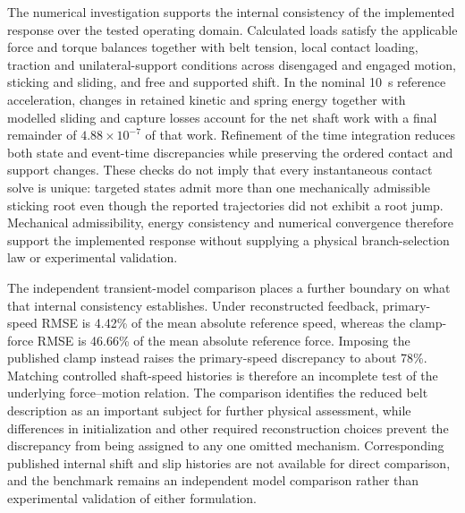 \documentclass[11pt]{report}
\numberwithin{equation}{section}
\begin{document}
The numerical investigation supports the internal consistency of the implemented response over
the tested operating domain. Calculated loads satisfy the applicable force and torque balances
together with belt tension, local contact loading, traction and unilateral-support conditions
across disengaged and engaged motion, sticking and sliding, and free and supported shift. In
the nominal \SI{10}{\second} reference acceleration, changes in retained kinetic and spring
energy together with modelled sliding and capture losses account for the net shaft work with a
final remainder of \(4.88\times10^{-7}\) of that work. Refinement of the time integration
reduces both state and event-time discrepancies while preserving the ordered contact and support
changes. These checks do not imply that every instantaneous contact solve is unique: targeted
states admit more than one mechanically admissible sticking root even though the reported
trajectories did not exhibit a root jump. Mechanical admissibility, energy consistency and
numerical convergence therefore support the implemented response without supplying a physical
branch-selection law or experimental validation.

The independent transient-model comparison places a further boundary on what that internal
consistency establishes. Under reconstructed feedback, primary-speed RMSE is 4.42\% of the
mean absolute reference speed, whereas the clamp-force RMSE is 46.66\% of the mean absolute
reference force. Imposing the published clamp instead raises the primary-speed discrepancy to
about 78\%. Matching controlled shaft-speed histories is therefore an incomplete test of the
underlying force--motion relation. The comparison identifies the reduced belt description as
an important subject for further physical assessment, while differences in initialization and
other required reconstruction choices prevent the discrepancy from being assigned to any one
omitted mechanism. Corresponding published internal shift and slip histories are not available
for direct comparison, and the benchmark remains an independent model comparison rather than
experimental validation of either formulation.
\end{document}
